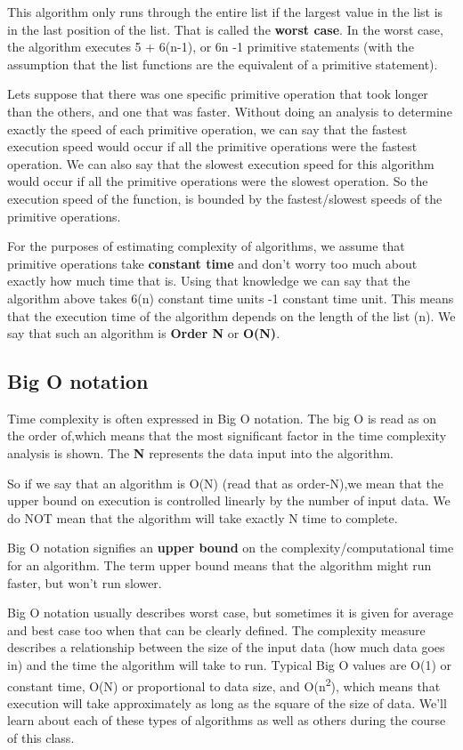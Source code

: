 This algorithm only runs through the entire list if the largest value in the list is in the last position of the list.  That is called the \textbf{worst case}.  In the worst case, the algorithm executes 5 + 6(n-1), or 6n -1  primitive statements (with the assumption that the list functions are the equivalent of a primitive statement).     

Lets suppose that there was one specific primitive operation that took longer than the others, and one that was faster.   Without doing an analysis to determine exactly the speed of each primitive operation,  we can say that the fastest execution speed would occur if all the primitive operations were the fastest operation.   We can also say that the slowest execution speed for this algorithm would occur if all the primitive operations were the slowest operation.    So the execution speed of the function, is bounded by the fastest/slowest speeds of the primitive operations.

For the purposes of estimating complexity of algorithms, we assume that primitive operations take \textbf{constant time} and don't worry too much about exactly how much time that is.    Using that knowledge we can say that the algorithm above takes 6(n) constant time units -1 constant time unit.    This means that the execution time of the algorithm depends on the length of the  list (n).   We say that such an algorithm is \textbf{Order N} or \textbf{O(N)}.

\subsection{Big O notation}

 Time
complexity is often expressed in Big O notation.
The big O is read as
on the order of,which means that the most significant factor in the
time complexity analysis is shown.   The \textbf{N}  represents the data input into the algorithm.  

So if we say that an algorithm is
O(N) (read that as order-N),we mean that the upper bound on execution
is controlled linearly by the number of input data.  We do NOT mean that the
algorithm will take exactly N time to complete.  


Big O notation signifies an \textbf{upper bound } on the complexity/computational
time for an algorithm.  The term upper bound means that the algorithm might run faster, but won't run
slower.

Big O notation usually describes worst case, but sometimes it is given
for average and best case too when that can be clearly defined. The
complexity measure describes a relationship between the size of the
input data (how much data goes in) and the time the algorithm will take
to run.  Typical Big O  values are O(1) or constant time, O(N) or proportional to data size, and O(n\textsuperscript{2}), which means that execution will take approximately as long as the square of the size of data.  We'll learn about each of these types of algorithms as well as others during the course of this class.


